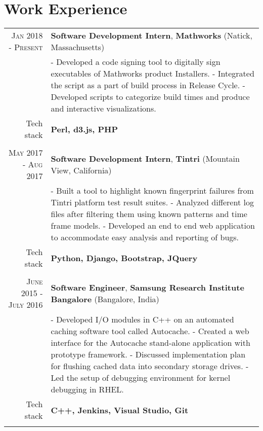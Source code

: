 \section {Work Experience}
\renewcommand{\arraystretch}{0.95}%
\begin{tabular}{r|p{14cm}}

\textsc {Jan 2018 - Present} & \textbf{Software Development Intern}, \textbf{Mathworks} (Natick, Massachusetts)\\
& \small{
- Developed a code signing tool to digitally sign executables of Mathworks product Installers. \newline
- Integrated the script as a part of build process in Release Cycle.\newline
- Developed scripts to categorize build times and produce and interactive visualizations.} \\
\small{Tech stack} &\footnotesize{\textbf{Perl, d3.js, PHP}} \\
\multicolumn{2}{c}{} \\

\textsc {May 2017 - Aug 2017} & \textbf{Software Development Intern}, \textbf{Tintri} (Mountain View, California)\\
& \small{
- Built a tool to highlight known fingerprint failures from Tintri platform test result suites. \newline
- Analyzed different log files after filtering them using known patterns and time frame models.\newline
- Developed an end to end web application to accommodate easy analysis and reporting of bugs.} \\
\small{Tech stack} &\footnotesize{\textbf{Python, Django, Bootstrap, JQuery}} \\
\multicolumn{2}{c}{} \\

\textsc {June 2015 - July 2016} & \textbf{Software Engineer}, \textbf{Samsung Research Institute Bangalore} (Bangalore, India) \\
& \small{
- Developed I/O modules in C++ on an automated caching software tool called Autocache.\newline
- Created a web interface for the Autocache stand-alone application with prototype framework.\newline
- Discussed implementation plan for flushing cached data into secondary storage drives.\newline
- Led the setup of debugging environment for kernel debugging in RHEL.}\\
\small{Tech stack} &\footnotesize{\textbf{C++, Jenkins, Visual Studio, Git}} \\
\multicolumn{2}{c}{} \\



\end{tabular}
